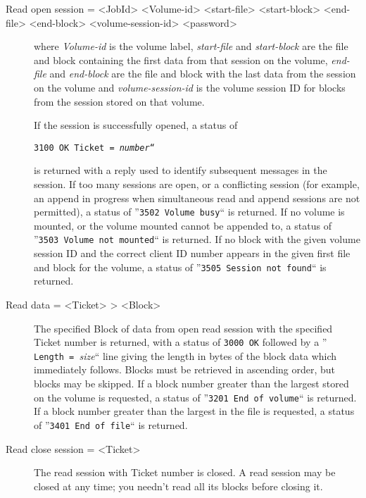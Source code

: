 \begin{description}

\item [Read open session = {\textless}JobId{\textgreater} {\textless}Volume-id{\textgreater}
   {\textless}start-file{\textgreater} {\textless}start-block{\textgreater}  {\textless}end-file{\textgreater}
   {\textless}end-block{\textgreater} {\textless}volume-session-id{\textgreater} {\textless}password{\textgreater}  ]
where {\it Volume-id} is the volume label,  {\it start-file} and {\it
start-block} are the file and block containing the  first data from that
session on the volume, {\it end-file} and  {\it end-block} are the file and
block with the last data from the session on  the volume and {\it
volume-session-id} is the volume session ID for blocks from the  session
stored on that volume.

If the session is successfully opened, a status of

{\tt {\tt 3100\ OK Ticket\ =\ }{\it number}``}

is returned with a reply used to identify  subsequent messages in the session.
If too many sessions are open, or a  conflicting session (for example, an
append in progress when simultaneous read  and append sessions are not
permitted), a status of  ''{\tt 3502\ Volume\ busy}`` is returned. If no
volume is mounted, or  the volume mounted cannot be appended to, a status of
''{\tt 3503\ Volume\ not\ mounted}`` is returned. If no block with  the given
volume session ID and the correct client ID number appears in the  given first
file and block for the volume, a status of  ''{\tt 3505\ Session\ not\
found}`` is returned.

\item [Read data = {\textless}Ticket{\textgreater} {\textgreater} {\textless}Block{\textgreater}  ]
   \index{SPAN class }
   The specified Block of data from open read session with the specified Ticket
number  is returned, with a status of {\tt 3000\ OK} followed  by a ''{\tt
Length\ =\ }{\it size}`` line giving the length in  bytes of the block data
which immediately follows. Blocks must be retrieved in  ascending order, but
blocks may be skipped. If a block number greater than the  largest stored on
the volume is requested, a status of  ''{\tt 3201\ End\ of\ volume}`` is
returned. If a block number  greater than the largest in the file is
requested, a status of  ''{\tt 3401\ End\ of\ file}`` is returned.

\item [Read close session = {\textless}Ticket{\textgreater}  ]
   The read session with Ticket number is closed. A read session  may be closed
at any time; you needn't read all its blocks before closing it.
\end{description}

